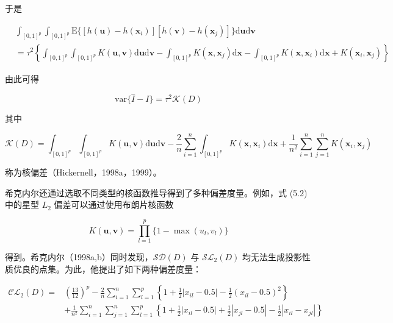 \documentclass{ctexart}
\begin{document}
于是

\begin{align*}
&\int_{[0,1]^p}\int_{[0,1]^p}\mathrm{E}\{\left[h(\boldsymbol{u})-h(\boldsymbol{x}_i)\right]\left[h(\boldsymbol{v})-h(\boldsymbol{x}_j)\right]\}\mathrm{d}\boldsymbol{u}\mathrm{d}\boldsymbol{v}\\
&=\tau^2\left\{\int_{[0,1]^p}\int_{[0,1]^p}K(\boldsymbol{u},\boldsymbol{v})\mathrm{d}\boldsymbol{u}\mathrm{d}\boldsymbol{v}-\int_{[0,1]^p}K(\boldsymbol{x},\boldsymbol{x}_j)\mathrm{d}\boldsymbol{x}-\int_{[0,1]^p}K(\boldsymbol{x},\boldsymbol{x}_i)\mathrm{d}\boldsymbol{x}+K(\boldsymbol{x}_i,\boldsymbol{x}_j)\right\}
\end{align*}

由此可得

\begin{equation*}
\mathrm{var}\{\widehat{I}-I\}=\tau^2\mathcal{K}(D)
\end{equation*}

其中

\begin{equation*}
\mathcal{K}(D)=\int_{[0,1]^p}\int_{[0,1]^p}K(\boldsymbol{u},\boldsymbol{v})\mathrm{d}\boldsymbol{u}\mathrm{d}\boldsymbol{v}
-\frac{2}{n}\sum_{i=1}^n\int_{[0,1]^p}K(\boldsymbol{x},\boldsymbol{x}_i)\mathrm{d}\boldsymbol{x}
+\frac{1}{n^2}\sum_{i=1}^n\sum_{j=1}^nK(\boldsymbol{x}_i,\boldsymbol{x}_j)
\tag{5.5}
\end{equation*}

称为核偏差（Hickernell，1998a，1999）。

希克内尔还通过选取不同类型的核函数推导得到了多种偏差度量。例如，式 (5.2) 中的星型 $L_2$ 偏差可以通过使用布朗片核函数

\begin{equation*}
K(\boldsymbol{u},\boldsymbol{v})=\prod_{l=1}^{p}\{1-\max(u_l,v_l)\}
\end{equation*}

得到。希克内尔（1998a,b）同时发现，$\mathcal{S}\mathcal{D}(D)$ 与 $\mathcal{S}\mathcal{L}_2(D)$ 均无法生成投影性质优良的点集。为此，他提出了如下两种偏差度量：

\begin{align*}
\mathcal{C}\mathcal{L}_2(D)=& \left(\frac{13}{12}\right)^p-\frac{2}{n}\sum_{i=1}^{n}\sum_{l=1}^{p}\left\{1+\frac12|x_{il}-0.5|-\frac12(x_{il}-0.5)^2\right\} \\
&+\frac{1}{n^2}\sum_{i=1}^{n}\sum_{j=1}^{n}\sum_{l=1}^{p}\left\{1+\frac12|x_{il}-0.5|+\frac12|x_{jl}-0.5|-\frac12|x_{il}-x_{jl}|\right\}
\tag{5.6}
\end{align*}
\end{document}
